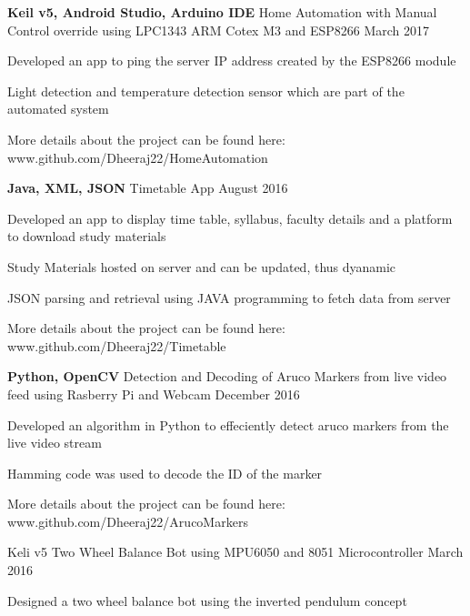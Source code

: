 \begin{cventries}
  \cventry
    {\textbf{Keil v5, Android Studio, Arduino IDE}}
    {Home Automation with Manual Control override using LPC1343 ARM Cotex M3 and ESP8266}
   {}
    {March 2017}
    {
      \begin{cvitems}
        \item {Developed an app to ping the server IP address created by the ESP8266 module}
         \item {Light detection and temperature detection sensor which are part of the automated system}
         \item {More details about the project can be found here: \textcolor{awesome-emerald}{www.github.com/Dheeraj22/HomeAutomation}}
      \end{cvitems}
    }
     \cventry
    {\textbf{Java, XML, JSON}}
    {Timetable App}
    {}
    {August 2016}
    {
      \begin{cvitems}
        \item {Developed an app to display time table, syllabus, faculty details and a platform to download study materials}
         \item {Study Materials hosted on server and can be updated, thus dyanamic}
         \item {JSON parsing and retrieval using JAVA programming to fetch data from server}
         \item {More details about the project can be found here: \textcolor{awesome-emerald}{www.github.com/Dheeraj22/Timetable}}
      \end{cvitems}
    }
    \cventry
    {\textbf{Python, OpenCV}}
    {Detection and Decoding of Aruco Markers from live video feed using Rasberry Pi and Webcam}
    {}
    {December 2016}
    {
      \begin{cvitems}
        \item {Developed an algorithm in Python to effeciently detect aruco markers from the live video stream}
         \item {Hamming code was used to decode the ID of the marker}
         \item {More details about the project can be found here: \textcolor{awesome-emerald}{www.github.com/Dheeraj22/ArucoMarkers}}
      \end{cvitems}
    }
     \cventry
    {Keli v5}
    {Two Wheel Balance Bot using MPU6050 and 8051 Microcontroller}
    {}
    {March 2016}
    {
      \begin{cvitems}
        \item {Designed a two wheel balance bot using the inverted pendulum concept}

\end{cvitems}}
\end{cventries}
